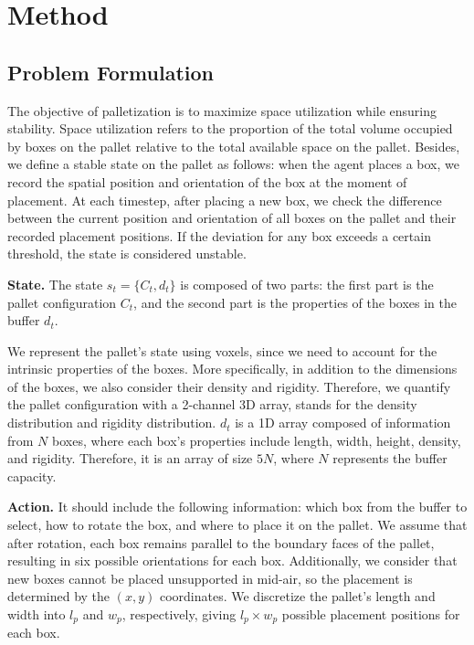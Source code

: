 \section{Method}
\label{section:Method}
\subsection{Problem Formulation}
The objective of palletization is to maximize space utilization while ensuring stability. Space utilization refers to the proportion of the total volume occupied by boxes on the pallet relative to the total available space on the pallet. Besides, we define a stable state on the pallet as follows: when the agent places a box, we record the spatial position and orientation of the box at the moment of placement. At each timestep, after placing a new box, we check the difference between the current position and orientation of all boxes on the pallet and their recorded placement positions. If the deviation for any box exceeds a certain threshold, the state is considered unstable.

\textbf{State.} The state $s_t = \{C_t,d_t\}$ is composed of two parts: the first part is the pallet configuration $C_t$, and the second part is the properties of the boxes in the buffer $d_t$.

We represent the pallet's state using voxels, since we need to account for the intrinsic properties of the boxes. More specifically, in addition to the dimensions of the boxes, we also consider their density and rigidity. Therefore, we quantify the pallet configuration with a 2-channel 3D array, stands for the density distribution and rigidity distribution. $d_t$ is a 1D array composed of information from $N$ boxes, where each box's properties include length, width, height, density, and rigidity. Therefore, it is an array of size $5N$, where $N$ represents the buffer capacity.

\textbf{Action.} It should include the following information: which box from the buffer to select, how to rotate the box, and where to place it on the pallet. We assume that after rotation, each box remains parallel to the boundary faces of the pallet, resulting in six possible orientations for each box. Additionally, we consider that new boxes cannot be placed unsupported in mid-air, so the placement is determined by the $(x,y)$ coordinates. We discretize the pallet's length and width into $l_p$ and $w_p$, respectively, giving $l_p \times w_p$ possible placement positions for each box.

